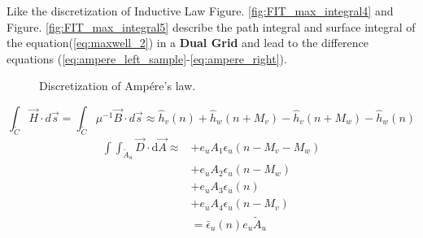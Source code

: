 Like the discretization of Inductive Law Figure. \ref{fig:FIT_max_integral4} and Figure.  \ref{fig:FIT_max_integral5} describe the path integral and surface integral of the equation(\ref{eq:maxwell_2}) in a \textbf{Dual Grid} and lead to the difference equations (\ref{eq:ampere_left_sample}-\ref{eq:ampere_right}).
\begin{figure}
\hfill
\caption{Discretization of Amp\'ere's law.}
\end{figure}
\begin{equation}
\int_{\tilde{C}}\vec{H}\cdot d\vec{s}=\int_{\tilde{C}}\mu^{-1}\vec{B}\cdot d\vec{s}\approx
\widehat{h}_{v}(n)
+\widehat{h}_{w}(n+M_{v})
-\widehat{h}_{v}(n+M_{w})
-\widehat{h}_{w}(n)
\label{eq:ampere_left_sample}
\end{equation}
\begin{align}
\int\int_{\tilde{A}_{u}}\vec{D}\cdot\mathrm{d}\vec{A}\approx &+e_{u}A_{1}\epsilon_{u}(n-M_{v}-M_{w}) \nonumber\\
&+e_{u}A_{2}\epsilon_{u}(n-M_{w}) \nonumber\\
&+e_{u}A_{3}\epsilon_{u}(n) \nonumber\\
&+e_{u}A_{4}\epsilon_{u}(n-M_{v}) \nonumber\\
&=\bar{\epsilon}_{u}(n)e_{u}\tilde{A}_{u}
\label{eq:ampere_right}
\end{align}

